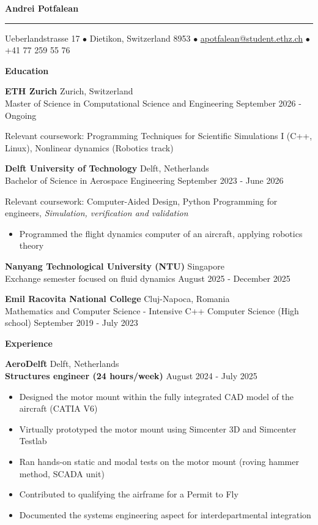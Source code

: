 \documentclass[11pt]{article}
\newcommand{\cvsection}[1]{%
  \vspace{16pt}%
  \centerline{\textbf{#1}}%
  \vspace{8pt}%
}
\newcommand{\cventry}[4]{%
  \textbf{#1} \hfill #2 \\
  #3 \hfill #4\par
}
\newcommand{\cvrole}[4]{%
  \textbf{#1} \hfill #2 \\
  \textbf{#3} \hfill #4\par
}
\newcommand{\cvgap}{\vspace{0.7em}}
\begin{document}
\begin{center}
  {\LARGE\textbf{Andrei Potfalean}}
\end{center}
\vspace{0.8pt}
\hrule
\vspace{18pt}
\centerline{Ueberlandstrasse 17 $\bullet$ Dietikon, Switzerland 8953 $\bullet$
  \href{mailto:apotfalean@student.ethz.ch}{apotfalean@student.ethz.ch} $\bullet$ +41 77 259 55 76}

\cvsection{Education}

\cventry{ETH Zurich}{Zurich, Switzerland}
  {Master of Science in Computational Science and Engineering}{September 2026 - Ongoing}
Relevant coursework: Programming Techniques for Scientific Simulations I (C++, Linux), Nonlinear dynamics (Robotics track)
\cvgap

\cventry{Delft University of Technology}{Delft, Netherlands}
  {Bachelor of Science in Aerospace Engineering}{September 2023 - June 2026}
Relevant coursework: Computer-Aided Design, Python Programming for engineers, \textit{Simulation, verification and validation}
\begin{itemize}
  \item Programmed the flight dynamics computer of an aircraft, applying robotics theory
\end{itemize}
\cvgap

\cventry{Nanyang Technological University (NTU)}{Singapore}
  {Exchange semester focused on fluid dynamics}{August 2025 - December 2025}
\cvgap

\cventry{Emil Racovita National College}{Cluj-Napoca, Romania}
  {Mathematics and Computer Science - Intensive C++ Computer Science (High school)}{September 2019 - July 2023}

\cvsection{Experience}

\cvrole{AeroDelft}{Delft, Netherlands}{Structures engineer (24 hours/week)}{August 2024 - July 2025}
\begin{itemize}
  \item Designed the motor mount within the fully integrated CAD model of the aircraft (CATIA V6)
  \item Virtually prototyped the motor mount using Simcenter 3D and Simcenter Testlab
  \item Ran hands-on static and modal tests on the motor mount (roving hammer method, SCADA unit)
  \item Contributed to qualifying the airframe for a Permit to Fly
  \item Documented the systems engineering aspect for interdepartmental integration
\end{itemize}
\cvgap
\end{document}
